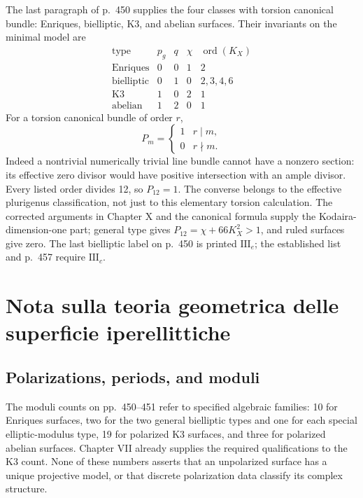 The last paragraph of p.~450 supplies the four classes with torsion canonical bundle: Enriques, bielliptic, K3, and abelian surfaces. Their invariants on the minimal model are
\[
\begin{array}{c|c|c|c|c}
\text{type}&p_g&q&\chi&\operatorname{ord}(K_X)\\\hline
\text{Enriques}&0&0&1&2\\
\text{bielliptic}&0&1&0&2,3,4,6\\
\text{K3}&1&0&2&1\\
\text{abelian}&1&2&0&1
\end{array}
\]
For a torsion canonical bundle of order \(r\),
\[
P_m=\begin{cases}1&r\mid m,\\0&r\nmid m.\end{cases}
\]
Indeed a nontrivial numerically trivial line bundle cannot have a nonzero section: its effective zero divisor would have positive intersection with an ample divisor. Every listed order divides 12, so \(P_{12}=1\). The converse belongs to the effective plurigenus classification, not just to this elementary torsion calculation. The corrected arguments in Chapter X and the canonical formula supply the Kodaira-dimension-one part; general type gives \(P_{12}=\chi+66K_X^2>1\), and ruled surfaces give zero. The last bielliptic label on p.~450 is printed \(\mathrm{III}_e\); the established list and p.~457 require \(\mathrm{III}_c\).

\section[Teoria geometrica delle superficie iperellittiche]{Nota sulla teoria geometrica delle superficie iperellittiche}
\label{cp2-xi-6}

\subsection{Polarizations, periods, and moduli}

The moduli counts on pp.~450--451 refer to specified algebraic families: 10 for Enriques surfaces, two for the two general bielliptic types and one for each special elliptic-modulus type, 19 for polarized K3 surfaces, and three for polarized abelian surfaces. Chapter VII already supplies the required qualifications to the K3 count. None of these numbers asserts that an unpolarized surface has a unique projective model, or that discrete polarization data classify its complex structure.

